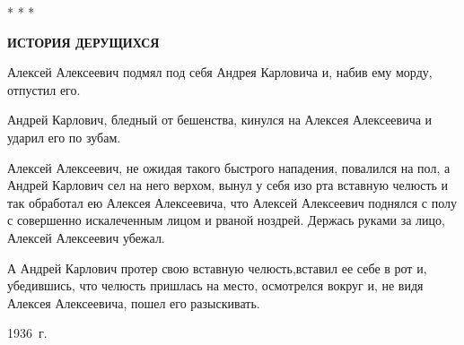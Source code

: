 \begin{center}
    * * *
\end{center}

\begin{center}
    \textbf{ИСТОРИЯ ДЕРУЩИХСЯ}
\end{center}
    Алексей Алексеевич подмял под себя  
    Андрея Карловича и,  набив ему морду,  отпустил
его.

    Андрей Карлович, бледный  от  бешенства,
кинулся на Алексея  Алексеевича и ударил его
по зубам.

    Алексей Алексеевич, не ожидая такого 
    быстрого нападения, повалился на пол, а Андрей
Карлович сел на него верхом,  вынул  у  себя
изо рта вставную челюсть и так обработал  ею
Алексея Алексеевича, что Алексей  Алексеевич
поднялся  с полу с  совершенно  искалеченным
лицом и рваной ноздрей.  Держась  руками  за
лицо, Алексей Алексеевич убежал.

    А Андрей Карлович  протер свою  вставную
челюсть,вставил ее себе в рот и, убедившись,
что  челюсть  пришлась на место,  осмотрелся
вокруг и, не видя Алексея Алексеевича, пошел
его разыскивать.

\begin{flushright}
    1936~г.
\end{flushright}